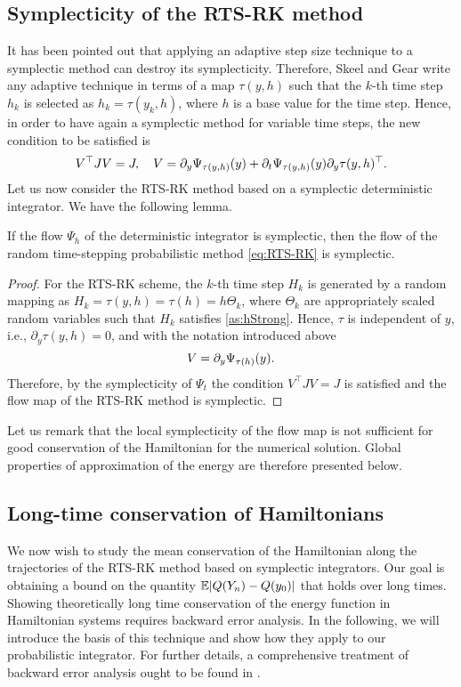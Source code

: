 \documentclass[10pt]{article}
\begin{document}
\subsection{Symplecticity of the RTS-RK method} It has been pointed out \cite[Section VIII.1]{HLW06} that applying an adaptive step size technique to a symplectic method can destroy its symplecticity. Therefore, Skeel and Gear \cite{SkG92} write any adaptive technique in terms of a map $\tau(y, h)$ such that the $k$-th time step $h_k$ is selected as $h_k = \tau(y_k, h)$, where $h$ is a base value for the time step. Hence, in order to have again a symplectic method {for variable time steps}, the new condition to be satisfied is
\begin{equation}\label{eq:SymplecticCondition}
V^\top J V = J, \quad V = \pdv{\Psi_{\tau(y, h)}(y)}{y} + \pdv{\Psi_{\tau(y, h)}(y)}{t}\pdv{\tau(y, h)}{y}^\top.
\end{equation}
Let us now consider the RTS-RK method based on a symplectic deterministic integrator. We have the following lemma. 
\begin{lemma}\label{lem:SympRTSRK} If the flow $\Psi_h$ of the deterministic integrator is symplectic, then the flow of the random time-stepping probabilistic method \eqref{eq:RTS-RK} is symplectic.
\end{lemma}
\begin{proof} For the RTS-RK scheme, the $k$-th time step $H_k$ is generated by a random mapping as $H_k = \tau(y, h) = \tau(h) = h\Theta_k$, where $\Theta_k$ are appropriately scaled random variables such that $H_k$ satisfies \cref{as:hStrong}. Hence, $\tau$ is independent of $y$, i.e., $\partial_y \tau(y, h) = 0$, and with the notation introduced above 
	\begin{equation}
	V = \pdv{\Psi_{\tau(h)}(y)}{y}.
	\end{equation}
	Therefore, by the symplecticity of $\Psi_t$ the condition $V^\top J V = J$ is satisfied and the flow map of the RTS-RK method is symplectic.
\end{proof}
Let us remark that the local symplecticity of the flow map is not sufficient for good conservation of the Hamiltonian for the numerical solution. Global properties of approximation of the energy are therefore presented below.

\subsection{Long-time conservation of Hamiltonians}\label{sec:Hamiltonian_2} We now wish to study the mean conservation of the Hamiltonian along the trajectories of the RTS-RK method based on symplectic integrators. Our goal is obtaining a bound on the quantity $\E\abs{Q(Y_n) - Q(y_0)}$ that holds over long times. Showing theoretically long time conservation of the energy function in Hamiltonian systems requires backward error analysis. In the following, we will introduce the basis of this technique and show how they apply to our probabilistic integrator. {For further details, a comprehensive treatment of backward error analysis ought to be found in \cite[Chapter IX]{HLW06}.}
\end{document}

